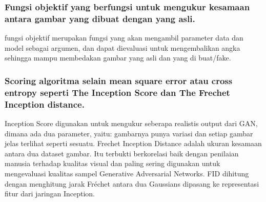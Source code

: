 \subsubsection{Fungsi objektif yang berfungsi untuk mengukur kesamaan antara gambar yang dibuat dengan yang asli.} 
\hfill\break
fungsi objektif merupakan fungsi yang akan mengambil parameter data dan model sebagai argumen, dan dapat dievaluasi untuk mengembalikan angka sehingga mampu membedakan gambar yang asli dan yang di buat/fake.

\subsubsection{Scoring algoritma selain mean square error atau cross entropy seperti The Inception Score dan The Frechet Inception distance.} 
\hfill\break
Inception Score digunakan untuk mengukur seberapa realistis output dari GAN, dimana ada dua parameter, yaitu: gambarnya punya variasi dan setiap gambar jelas terlihat seperti sesuatu. Frechet Inception Distance adalah ukuran kesamaan antara dua dataset gambar. Itu terbukti berkorelasi baik dengan penilaian manusia terhadap kualitas visual dan paling sering digunakan untuk mengevaluasi kualitas sampel Generative Adversarial Networks. FID dihitung dengan menghitung jarak Fréchet antara dua Gaussians dipasang ke representasi fitur dari jaringan Inception.

